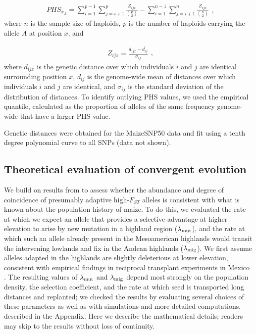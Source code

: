 \begin{equation}
  \label{phs-1}
  \begin{array}{l}
  \displaystyle{
PHS_{x_A} = \sum^{p-1}_{i=1}\sum^{p}_{j=i+1} \frac{ Z_{ijx} }{ {p \choose 2} } - \sum^{n-1}_{i=1}\sum^{n}_{j=i+1} \frac{ Z_{ijx}  }{ {n \choose 2}}
  }
  \end {array} 
  \textrm{,}
\end{equation}
\noindent where $n$ is the sample size of haploids, $p$  is the number of haploids carrying the allele $A$ at position $x$, and

\begin{equation}
  \label{phs-2}
  \begin{array}{l}
  \displaystyle{
Z_{ijx} = \frac{ d_{ijx} - \bar{d_{ij}} }{ \sigma_{ij} }
  }
  \end {array} 
  \textrm{,}
\end{equation}
\noindent where $d_{ijx}$ is the genetic distance over which individuals $i$ and $j$ are identical surrounding position $x$, 
$\bar{d_{ij}}$ is the genome-wide mean of distances over which individuals $i$ and $j$ are identical, 
and $\sigma_{ij}$ is the standard deviation of the distribution of distances.  
To identify outlying PHS values, we used the empirical quantile, calculated as the proportion of alleles of the same frequency genome-wide that have a larger PHS value. 

Genetic distances were obtained for the MaizeSNP50 data \cite[]{Ganal_2011_22174790} and fit using a tenth degree polynomial curve to all SNPs (data not shown).

\subsection*{Theoretical evaluation of convergent evolution }
We build on results from \cite{ralph2014convergent} to assess whether the abundance and degree of coincidence of presumably adaptive high-$F_{ST}$ alleles is consistent with what is known about the population history of maize.
To do this,
we evaluated the rate at which we expect an allele that provides a selective advantage at higher elevation to arise by new mutation in a highland region ($\lambda_{\text{mut}}$), and the rate at which such an allele already present in the Mesoamerican highlands would transit the intervening lowlands and fix in the Andean highlands ($\lambda_{\text{mig}}$).
We first assume alleles adapted in the highlands are slightly deleterious at lower elevation, consistent with empirical findings in reciprocal transplant experiments in Mexico \cite[]{Mercer2008}.
The resulting values of $\lambda_{\text{mut}}$ and $\lambda_{\text{mig}}$ depend most strongly on the population density, the selection coefficient, and the rate at which seed is transported long distances and replanted;
we checked the results by evaluating several choices of these parameters as well as with simulations and more detailed computations, described in the Appendix.
Here we describe the mathematical details; readers may skip to the results without loss of continuity.

